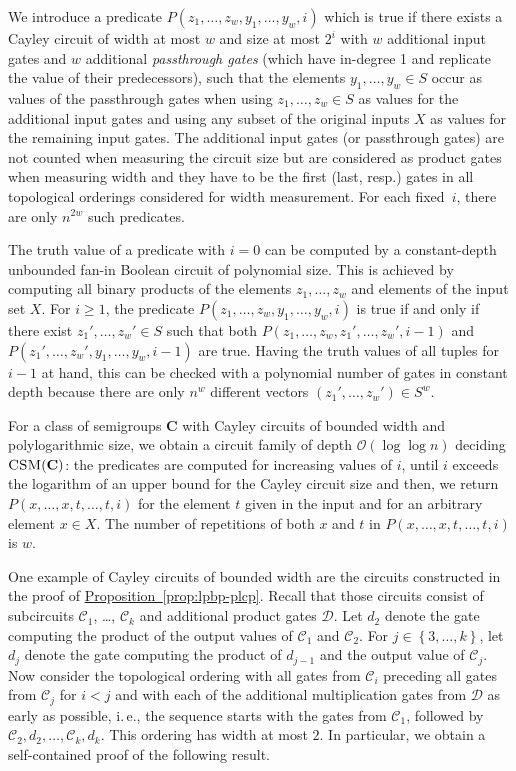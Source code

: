 \documentclass[11pt]{article}
\numberwithin{equation}{section}
\theoremstyle{definition}
\theoremstyle{plain}
\newcommand{\C}{\mathbb C}
\newcommand{\ie}{i.\,e.}
\newcommand{\expref}[2]{\hyperref[#2]{#1~\ref{#2}}}
\renewcommand{\geq}{\geqslant}
\renewcommand{\ge}{\geq}
\newcommand{\os}[1]{\ensuremath{\left\{#1\right\}}}
\newcommand{\bigO}{\mathcal{O}}
\newcommand{\vC}{\mathbf{C}}
\newcommand{\CSM}{\ensuremath{\textsc{CSM}}}
\renewcommand{\C}{\ensuremath{\mathcal{C}}}
\begin{document}
We introduce a predicate $P(z_1, \dots, z_w, y_1, \dots, y_w, i)$ which is true
if there exists a Cayley circuit of width at most $w$ and size at most $2^i$
with $w$ additional input gates and $w$ additional \emph{passthrough gates}
(which have in-degree 1 and replicate the value of their predecessors), such
that the elements $y_1, \dots, y_w \in S$ occur as values of the passthrough
gates when using $z_1, \dots, z_w \in S$ as values for the additional input
gates and using any subset of the original inputs $X$ as values for the
remaining input gates.
%
The additional input gates
%
(or passthrough gates)  %
are not counted when measuring the circuit size but are considered 
as product gates when measuring
width and they have to be the first %
(last, resp.)   %
gates in all topological orderings considered for width measurement.
%
For each fixed~$i$, there are only $n^{2w}$ such predicates.

The truth value of a predicate with $i = 0$ can be computed by a constant-depth
unbounded fan-in Boolean circuit of polynomial size. This is achieved by
computing all binary products of the elements $z_1, \dots, z_w$ and elements of
the input set $X$.
%
For $i \ge 1$, the predicate $P(z_1, \dots, z_w, y_1, \dots, y_w, i)$ is true if
and only if there exist $z_1', \dots, z_w' \in S$ such that both $P(z_1, \dots,
z_w, z_1', \dots, z_w', i-1)$ and $P(z_1', \dots, z_w', y_1, \dots, y_w, i-1)$
are true.
%
Having the truth values of all tuples for $i-1$ at hand, this can be checked
with a polynomial number of gates in constant depth because there are only
$n^w$ different vectors $(z_1', \dots, z_w') \in S^w$.

For a class of semigroups $\vC$ with Cayley circuits of bounded width and
polylogarithmic size, we obtain a circuit family of depth $\bigO(\log \log n)$
deciding $\CSM(\vC)$:
%
the predicates are computed for increasing values of $i$, until $i$ exceeds the
logarithm of an upper bound for the Cayley circuit size and then, we return
$P(x, \dots, x, t, \dots, t, i)$ for the element $t$ given in the input and for
an arbitrary element $x \in X$.
%
The number of repetitions of both $x$ and $t$ in $P(x, \dots, x, t, \dots, t,
i)$ is $w$.

One example of Cayley circuits of bounded width are the circuits constructed in
the proof of \expref{Proposition}{prop:lpbp-plcp}.
%
Recall that those circuits consist of subcircuits $\C_1$, \dots, $\C_k$ and
additional product gates $\mathcal{D}$.
%
Let $d_2$ denote the gate computing the product of the output values of $\C_1$
and $\C_2$. For $j \in \os{3, \dots, k}$, let $d_j$ denote the gate computing
the product of $d_{j-1}$ and the output value of $\C_j$.
%
Now consider the topological ordering with all gates from $\C_i$ preceding all
gates from $\C_j$ for $i < j$ and with each of the additional multiplication
gates from $\mathcal{D}$ as early as possible, \ie, the sequence starts with
the gates from $\C_1$, followed by $\C_2, d_2, \dots, \C_k, d_k$.
%
This ordering has width at most $2$.
%
In particular, we obtain a self-contained proof of the following result.
\end{document}
